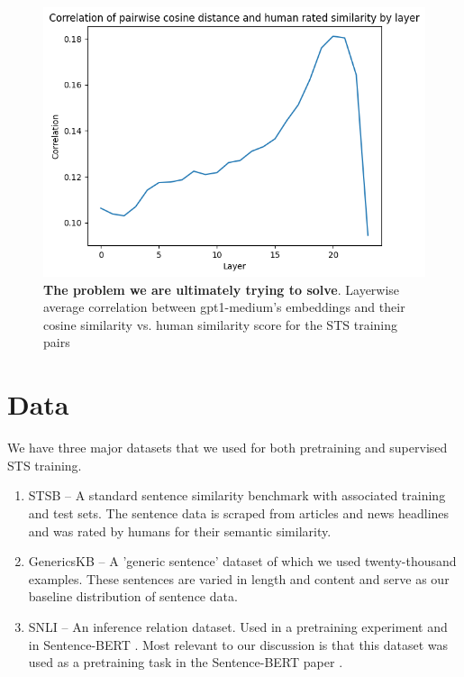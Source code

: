 \documentclass{article}
\begin{document}
\begin{figure}[!htb]
    \centering
    \includegraphics[width=0.65\linewidth]{raw_cosine_sim.png}
    \caption{\textbf{The problem we are ultimately trying to solve}. Layerwise average correlation between gpt1-medium's embeddings and their cosine similarity vs. human similarity score for the STS training pairs}
    \label{fig:raw-corr}
\end{figure}    


\section{Data}
We have three major datasets that we used for both pretraining and supervised STS training.
\begin{enumerate}
    \item STSB \cite{STS} -- A standard sentence similarity benchmark with associated training and test sets. The sentence data is scraped from articles and news headlines and was rated by humans for their semantic similarity.

    \item GenericsKB \cite{bhakthavatsalam2020genericskbknowledgebasegeneric} -- A 'generic sentence' dataset of which we used twenty-thousand examples. These sentences are varied in length and content and serve as our baseline distribution of sentence data.

    \item SNLI \cite{snli} -- An inference relation dataset. Used in a pretraining experiment and in Sentence-BERT \cite{reimers2019sentencebertsentenceembeddingsusing}. Most relevant to our discussion is that this dataset was used as a pretraining task in the Sentence-BERT paper \cite{reimers2019sentencebertsentenceembeddingsusing}.
\end{enumerate}
\end{document}
